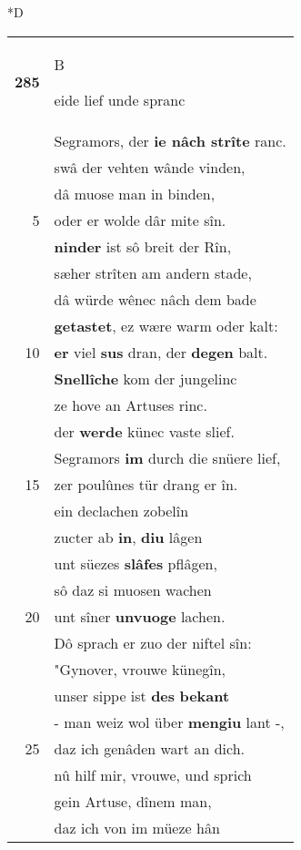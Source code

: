 \documentclass[8pt,a4paper,notitlepage]{article}
\begin{document}
\begin{table}[ht]
\begin{minipage}[t]{0.5\linewidth}
\small
\begin{center}*D
\end{center}
\begin{tabular}{rl}
\textbf{285} & \begin{large}B\end{large}eide lief unde spranc\\ 
 & Segramors, der \textbf{ie nâch strîte} ranc.\\ 
 & swâ der vehten wânde vinden,\\ 
 & dâ muose man in binden,\\ 
5 & oder er wolde dâr mite sîn.\\ 
 & \textbf{ninder} ist sô breit der Rîn,\\ 
 & sæher strîten am andern stade,\\ 
 & dâ würde wênec nâch dem bade\\ 
 & \textbf{getastet}, ez wære warm oder kalt:\\ 
10 & \textbf{er} viel \textbf{sus} dran, der \textbf{degen} balt.\\ 
 & \textbf{Snellîche} kom der jungelinc\\ 
 & ze hove an Artuses rinc.\\ 
 & der \textbf{werde} künec vaste slief.\\ 
 & Segramors \textbf{im} durch die snüere lief,\\ 
15 & zer poulûnes tür drang er în.\\ 
 & ein declachen zobelîn\\ 
 & zucter ab \textbf{in}, \textbf{diu} lâgen\\ 
 & unt süezes \textbf{slâfes} pflâgen,\\ 
 & sô daz si muosen wachen\\ 
20 & unt sîner \textbf{unvuoge} lachen.\\ 
 & Dô sprach er zuo der niftel sîn:\\ 
 & "Gynover, vrouwe künegîn,\\ 
 & unser sippe ist \textbf{des} \textbf{bekant}\\ 
 & - man weiz wol über \textbf{mengiu} lant -,\\ 
25 & daz ich genâden wart an dich.\\ 
 & nû hilf mir, vrouwe, und sprich\\ 
 & gein Artuse, dînem man,\\ 
 & daz ich von im müeze hân\\ 

\end{tabular}
\end{minipage}
\end{table}
\end{document}
